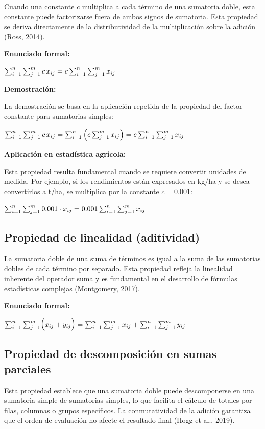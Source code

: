 \documentclass[
  spanish,
  letterpaper,
]{book}
\begin{document}
Cuando una constante \(c\) multiplica a cada término de una sumatoria
doble, esta constante puede factorizarse fuera de ambos signos de
sumatoria. Esta propiedad se deriva directamente de la distributividad
de la multiplicación sobre la adición (Ross, 2014).

\textbf{Enunciado formal:}

\(\huge \sum_{i=1}^{n}\sum_{j=1}^{m} c\,x_{ij}=c\sum_{i=1}^{n}\sum_{j=1}^{m} x_{ij}\)

\textbf{Demostración:}

La demostración se basa en la aplicación repetida de la propiedad del
factor constante para sumatorias simples:

\(\Large \sum_{i=1}^{n}\sum_{j=1}^{m} c\,x_{ij} = \sum_{i=1}^{n}\left(c\sum_{j=1}^{m} x_{ij}\right) = c\sum_{i=1}^{n}\sum_{j=1}^{m} x_{ij}\)

\textbf{Aplicación en estadística agrícola:}

Esta propiedad resulta fundamental cuando se requiere convertir unidades
de medida. Por ejemplo, si los rendimientos están expresados en kg/ha y
se desea convertirlos a t/ha, se multiplica por la constante
\(c=0.001\):

\(\Large \sum_{i=1}^{n}\sum_{j=1}^{m} 0.001 \cdot x_{ij} = 0.001 \sum_{i=1}^{n}\sum_{j=1}^{m} x_{ij}\)

\subsection{Propiedad de linealidad
(aditividad)}\label{propiedad-de-linealidad-aditividad}

La sumatoria doble de una suma de términos es igual a la suma de las
sumatorias dobles de cada término por separado. Esta propiedad refleja
la linealidad inherente del operador suma y es fundamental en el
desarrollo de fórmulas estadísticas complejas (Montgomery, 2017).

\textbf{Enunciado formal:}

\(\Large \sum_{i=1}^{n}\sum_{j=1}^{m}\bigl(x_{ij}+y_{ij}\bigr) = \sum_{i=1}^{n}\sum_{j=1}^{m} x_{ij} + \sum_{i=1}^{n}\sum_{j=1}^{m} y_{ij}\)

\subsection{Propiedad de descomposición en sumas
parciales}\label{propiedad-de-descomposiciuxf3n-en-sumas-parciales}

Esta propiedad establece que una sumatoria doble puede descomponerse en
una sumatoria simple de sumatorias simples, lo que facilita el cálculo
de totales por filas, columnas o grupos específicos. La conmutatividad
de la adición garantiza que el orden de evaluación no afecte el
resultado final (Hogg et al., 2019).
\end{document}
